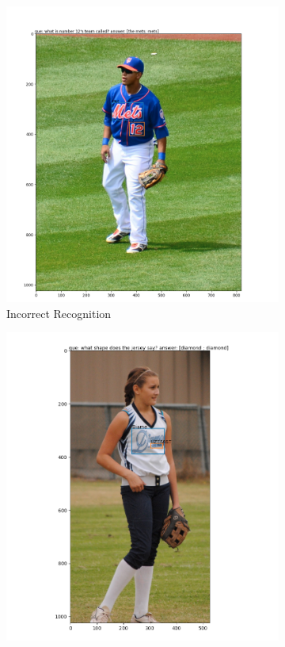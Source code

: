 \begin{figure}
\centering

\begin{subfigure}[b]{.4\textwidth}
\includegraphics[width=\linewidth]{figures/incorrect_recognition.png}
\caption{Incorrect Recognition}\label{fig:incorrect_recognition}
\end{subfigure}
\begin{subfigure}[b]{.4\textwidth}
\includegraphics[width=\textwidth]{figures/partially_covered.png}

\end{subfigure}
\end{figure}
